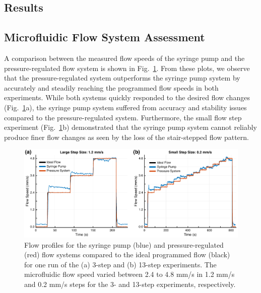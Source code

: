 \documentclass[12pt]{spieman}
\begin{document}
\begin{spacing}{2}
\section{Results}
\label{sect:results}

\subsection{Microfluidic Flow System Assessment}

A comparison between the measured flow speeds of the syringe pump and the pressure-regulated flow system is shown in Fig.~\ref{fig:syringe_vs_pressure}. From these plots, we observe that the pressure-regulated system outperforms the syringe pump system by accurately and steadily reaching the programmed flow speeds in both experiments. While both systems quickly responded to the desired flow changes (Fig.~\ref{fig:syringe_vs_pressure}a), the syringe pump system suffered from accuracy and stability issues compared to the pressure-regulated system. Furthermore, the small flow step experiment (Fig.~\ref{fig:syringe_vs_pressure}b) demonstrated that the syringe pump system cannot reliably produce finer flow changes as seen by the loss of the stair-stepped flow pattern.

\begin{figure}
    \includegraphics[width=\textwidth]{Figure3.pdf}
    \caption {
        Flow profiles for the syringe pump (blue) and pressure-regulated (red) flow systems compared to the ideal programmed flow (black) for one run of the (a) 3-step and (b) 13-step experiments. The microfluidic flow speed varied between 2.4 to 4.8 mm/s in 1.2 mm/s and 0.2 mm/s steps for the 3- and 13-step experiments, respectively.
    }
    \label{fig:syringe_vs_pressure}
\end{figure}


\end{spacing}
\end{document}
